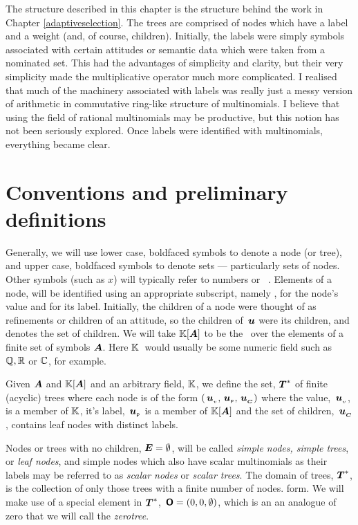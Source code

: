 The structure described in this chapter is the structure behind the
work in Chapter \ref{adaptiveselection}.  The trees are comprised of
nodes which have a label and a weight (and, of course, children).
Initially, the labels were simply symbols associated with certain
attitudes or semantic data which were taken from a nominated set.
This had the advantages of simplicity and clarity, but their very
simplicity made the multiplicative operator much more complicated. I
realised that much of the machinery associated with labels was really
just a messy version of arithmetic in commutative ring-like structure of
multinomials. I believe that using the field of rational multinomials
may be productive, but this notion has not been seriously explored.
Once labels were identified with multinomials, everything became
clear.

\section{Conventions and preliminary definitions}

Generally, we will use lower case, boldfaced symbols to denote a node
(or tree), and upper case, boldfaced symbols to denote sets ---
particularly sets of nodes.  Other symbols (such as \(x\)) will
typically refer to numbers or \polyrat\ \polyforms. Elements of a
node,  will be identified using an appropriate subscript,
namely , for the node's value and  for its
label. Initially, the children of a node were thought of as
refinements or children of an attitude, so the children of $\,\boldsymbol{u}$
were its children, and  denotes the set of children.  We will
take $\mathbb{K}[{\boldsymbol{A}}]$ to be the \polytypes\ over the elements of a finite set
of symbols $\boldsymbol{A}$.  Here $\mathbb{K}$\ would usually be some numeric
field such as $\mathbb{Q, R}$ or $\mathbb{C}$, for example.

\begin{definition}\label{def-of-dom}
  Given $\boldsymbol{A}$ and $\mathbb{K}[{\boldsymbol{A}}]$ and an arbitrary field, $\mathbb{K}$, we
  define the set, $\boldsymbol{T}^*$ of finite (acyclic) trees where each node is
  of the form $({\,\boldsymbol{u}}_{{}_{v}}, {\,\boldsymbol{u}}_{{}_{\mathsf{P}}}, {\,\boldsymbol{u}}_{{}_{\boldsymbol{C}}})$ where the value,
  ${\,\boldsymbol{u}}_{{}_{v}}$, is a member of $\mathbb{K}$, it's label, ${\,\boldsymbol{u}}_{{}_{\mathsf{P}}}$ is
  a member of $\mathbb{K}[{\boldsymbol{A}}]$ and the set of children, ${\,\boldsymbol{u}}_{{}_{\boldsymbol{C}}}$, contains
  leaf nodes with distinct labels.
\end{definition}

Nodes or trees with no children, \(\boldsymbol{E} = \emptyset\), will be
called \emph{simple nodes, simple trees}, or \emph{leaf nodes}, and
simple nodes which also have scalar multinomials as their labels may
be referred to as \emph{scalar nodes} or \emph{scalar trees}. The
domain of trees, $\boldsymbol{T}^*$, is the collection of only those trees with a
finite number of nodes.  form. We will make use of a special element
in $\boldsymbol{T}^*$, $\,\boldsymbol{\mathsf{O}} = (0, 0, \emptyset)$, which is an an analogue of
zero that we will call the \emph{zerotree}.

